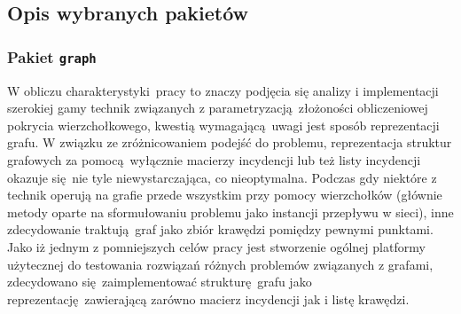 \subsection{Opis wybranych pakietów}\label{ss_internals_important_packages}
\subsubsection{Pakiet \texttt{graph}}
\par{
  W obliczu charakterystyki pracy to znaczy podjęcia się analizy i implementacji szerokiej gamy technik związanych z parametryzacją złożoności obliczeniowej pokrycia wierzchołkowego, kwestią wymagającą uwagi jest sposób reprezentacji grafu.
  W związku ze zróżnicowaniem podejść do problemu, reprezentacja struktur grafowych za pomocą wyłącznie macierzy incydencji lub też listy incydencji okazuje się nie tyle niewystarczająca, co nieoptymalna.
  Podczas gdy niektóre z technik operują na grafie przede wszystkim przy pomocy wierzchołków (głównie metody oparte na sformułowaniu problemu jako instancji przepływu w sieci), inne zdecydowanie traktują graf jako zbiór krawędzi pomiędzy pewnymi punktami.
  Jako iż jednym z pomniejszych celów pracy jest stworzenie ogólnej platformy użytecznej do testowania rozwiązań różnych problemów związanych z grafami, zdecydowano się zaimplementować strukturę grafu jako reprezentację zawierającą zarówno macierz incydencji jak i listę krawędzi.
}
